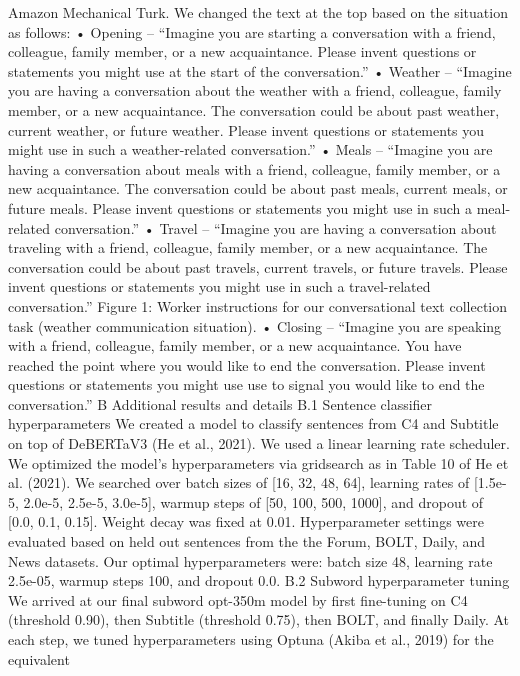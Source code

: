 Amazon Mechanical Turk. We changed the text at
the top based on the situation as follows:
• Opening – “Imagine you are starting a conversation with a friend, colleague, family member,
or a new acquaintance. Please invent questions
or statements you might use at the start of the
conversation.”
• Weather – “Imagine you are having a conversation about the weather with a friend, colleague,
family member, or a new acquaintance. The
conversation could be about past weather, current weather, or future weather. Please invent
questions or statements you might use in such a
weather-related conversation.”
• Meals – “Imagine you are having a conversation about meals with a friend, colleague, family
member, or a new acquaintance. The conversation
could be about past meals, current meals, or future meals. Please invent questions or statements
you might use in such a meal-related conversation.”
• Travel – “Imagine you are having a conversation
about traveling with a friend, colleague, family
member, or a new acquaintance. The conversation could be about past travels, current travels,
or future travels. Please invent questions or statements you might use in such a travel-related
conversation.”
Figure 1: Worker instructions for our conversational
text collection task (weather communication situation).
• Closing – “Imagine you are speaking with a
friend, colleague, family member, or a new acquaintance. You have reached the point where
you would like to end the conversation. Please
invent questions or statements you might use use
to signal you would like to end the conversation.”
B Additional results and details
B.1 Sentence classifier hyperparameters
We created a model to classify sentences from
C4 and Subtitle on top of DeBERTaV3 (He et al.,
2021). We used a linear learning rate scheduler. We
optimized the model’s hyperparameters via gridsearch as in Table 10 of He et al. (2021).
We searched over batch sizes of [16, 32, 48, 64],
learning rates of [1.5e-5, 2.0e-5, 2.5e-5, 3.0e-5],
warmup steps of [50, 100, 500, 1000], and dropout
of [0.0, 0.1, 0.15]. Weight decay was fixed at 0.01.
Hyperparameter settings were evaluated based on
held out sentences from the the Forum, BOLT,
Daily, and News datasets. Our optimal hyperparameters were: batch size 48, learning rate 2.5e-05,
warmup steps 100, and dropout 0.0.
B.2 Subword hyperparameter tuning
We arrived at our final subword opt-350m model
by first fine-tuning on C4 (threshold 0.90), then
Subtitle (threshold 0.75), then BOLT, and finally
Daily. At each step, we tuned hyperparameters
using Optuna (Akiba et al., 2019) for the equivalent
